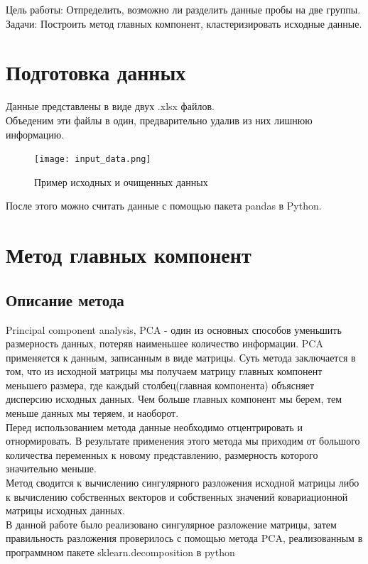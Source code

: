 \documentclass[a4]{article}
\begin{document}
	Цель работы: Отпределить, возможно ли разделить данные пробы на две группы.\\
	
	Задачи: Построить метод главных компонент, кластеризировать исходные данные.
	
	
	\section{Подготовка данных}
	Данные представлены в виде двух .xlsx файлов.\\
	Объеденим эти файлы в один, предварительно удалив из них лишнюю информацию. \\
	\begin{figure}[h!]
		\texttt{[image: input\_data.png]}\caption[Пример исходных и очищенных данных]{Пример исходных и очищенных данных}
	\end{figure}
	
	После этого можно считать данные с помощью пакета pandas в Python.
	
	\section{Метод главных компонент}
	\subsection{Описание метода}
		Principal component analysis, PCA - один из основных способов уменьшить размерность данных, потеряв наименьшее количество информации. PCA применяется к данным, записанным в виде матрицы. Суть метода заключается в том, что из исходной матрицы мы получаем матрицу главных компонент меньшего размера, где каждый столбец(главная компонента) объясняет дисперсию исходных данных. Чем больше главных компонент мы берем, тем меньше данных мы теряем, и наоборот.\\
		
		Перед использованием метода данные необходимо отцентрировать и отнормировать. В результате применения этого метода мы приходим от большого количества переменных к новому представлению, размерность которого значительно меньше.  \\
		
		Метод сводится к вычислению сингулярного разложения исходной матрицы либо к вычислению собственных векторов и собственных значений ковариационной матрицы исходных данных. \\
		
		В данной работе было реализовано сингулярное разложение матрицы, затем правильность разложения проверилось с помощью метода PCA, реализованным в программном пакете sklearn.decomposition в python
	
\end{document}
